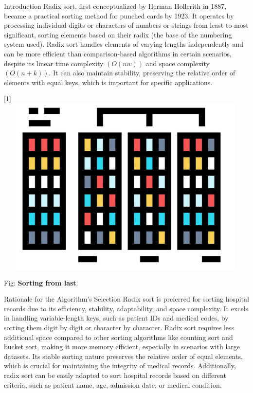 \documentclass[final]{beamer}
\newlength{\colwidth}
\begin{document}
\begin{frame}[t]
\begin{columns}[t]
\begin{column}{\colwidth}
			\begin{block}{Introduction}
			\justifying
            Radix sort, first conceptualized by Herman Hollerith in 1887, became a practical sorting method for punched cards by 1923. It operates by processing individual digits or characters of numbers or strings from least to most significant, sorting elements based on their radix (the base of the numbering system used). Radix sort handles elements of varying lengths independently and can be more efficient than comparison-based algorithms in certain scenarios, despite its linear time complexity $(O(nw))$ and space complexity $(O(n + k))$. It can also maintain stability, preserving the relative order of elements with equal keys, which is important for specific applications.
            \begin{center}
                \scalebox{-1}[1]{\includegraphics[height=9cm,width=13cm]{Pictures/Screenshot 2024-04-12 170700.png}}
                \addlinespace
                \caption{Fig:  \textbf{Sorting from last}.}
            \end{center}
				
			\end{block}
			\begin{block}{Rationale for the Algorithm's Selection}
			\justifying
           Radix sort is preferred for sorting hospital records due to its efficiency, stability, adaptability, and space complexity. It excels in handling variable-length keys, such as patient IDs and medical codes, by sorting them digit by digit or character by character. Radix sort requires less additional space compared to other sorting algorithms like counting sort and bucket sort, making it more memory efficient, especially in scenarios with large datasets. Its stable sorting nature preserves the relative order of equal elements, which is crucial for maintaining the integrity of medical records. Additionally, radix sort can be easily adapted to sort hospital records based on different criteria, such as patient name, age, admission date, or medical condition.
			\end{block}
			

\end{column}
\end{columns}
\end{frame}
\end{document}

